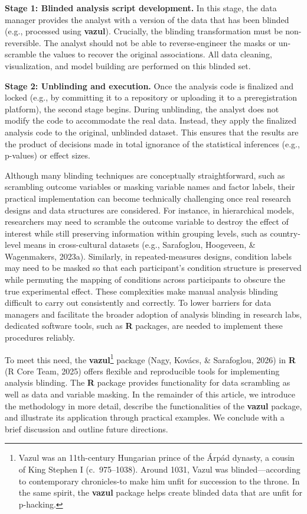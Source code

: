 \documentclass[
  english,
  man,floatsintext]{apa6}
\begin{document}
\textbf{Stage 1: Blinded analysis script development.} In this stage, the data manager provides the analyst with a version of the data that has been blinded (e.g., processed using \textbf{vazul}). Crucially, the blinding transformation must be non-reversible. The analyst should not be able to reverse-engineer the masks or un-scramble the values to recover the original associations. All data cleaning, visualization, and model building are performed on this blinded set.

\textbf{Stage 2: Unblinding and execution.} Once the analysis code is finalized and locked (e.g., by committing it to a repository or uploading it to a preregistration platform), the second stage begins. During unblinding, the analyst does not modify the code to accommodate the real data. Instead, they apply the finalized analysis code to the original, unblinded dataset. This ensures that the results are the product of decisions made in total ignorance of the statistical inferences (e.g., p-values) or effect sizes.

Although many blinding techniques are conceptually straightforward, such as scrambling outcome variables or masking variable names and factor labels, their practical implementation can become technically challenging once real research designs and data structures are considered. For instance, in hierarchical models, researchers may need to scramble the outcome variable to destroy the effect of interest while still preserving information within grouping levels, such as country-level means in cross-cultural datasets (e.g., Sarafoglou, Hoogeveen, \& Wagenmakers, 2023a). Similarly, in repeated-measures designs, condition labels may need to be masked so that each participant's condition structure is preserved while permuting the mapping of conditions across participants to obscure the true experimental effect. These complexities make manual analysis blinding difficult to carry out consistently and correctly. To lower barriers for data managers and facilitate the broader adoption of analysis blinding in research labs, dedicated software tools, such as \textbf{R} packages, are needed to implement these procedures reliably.

To meet this need, the \textbf{vazul}\footnote{Vazul was an 11th-century Hungarian prince of the Árpád dynasty, a cousin of King Stephen I (c.~975--1038). Around 1031, Vazul was blinded---according to contemporary chronicles-to make him unfit for succession to the throne. In the same spirit, the \textbf{vazul} package helps create blinded data that are unfit for p-hacking.} package (Nagy, Kovács, \& Sarafoglou, 2026) in \textbf{R} (R Core Team, 2025) offers flexible and reproducible tools for implementing analysis blinding. The \textbf{R} package provides functionality for data scrambling as well as data and variable masking. In the remainder of this article, we introduce the methodology in more detail, describe the functionalities of the \textbf{vazul} package, and illustrate its application through practical examples. We conclude with a brief discussion and outline future directions.
\end{document}
